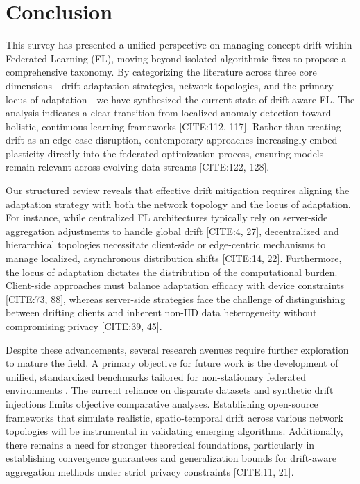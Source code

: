 \documentclass[journal]{IEEEtran}
\begin{document}
\section{Conclusion}
\label{sec:conclusion}

This survey has presented a unified perspective on managing concept drift within Federated Learning (FL), moving beyond isolated algorithmic fixes to propose a comprehensive taxonomy. By categorizing the literature across three core dimensions—drift adaptation strategies, network topologies, and the primary locus of adaptation—we have synthesized the current state of drift-aware FL. The analysis indicates a clear transition from localized anomaly detection toward holistic, continuous learning frameworks [CITE:112, 117]. Rather than treating drift as an edge-case disruption, contemporary approaches increasingly embed plasticity directly into the federated optimization process, ensuring models remain relevant across evolving data streams [CITE:122, 128].

Our structured review reveals that effective drift mitigation requires aligning the adaptation strategy with both the network topology and the locus of adaptation. For instance, while centralized FL architectures typically rely on server-side aggregation adjustments to handle global drift [CITE:4, 27], decentralized and hierarchical topologies necessitate client-side or edge-centric mechanisms to manage localized, asynchronous distribution shifts [CITE:14, 22]. Furthermore, the locus of adaptation dictates the distribution of the computational burden. Client-side approaches must balance adaptation efficacy with device constraints [CITE:73, 88], whereas server-side strategies face the challenge of distinguishing between drifting clients and inherent non-IID data heterogeneity without compromising privacy [CITE:39, 45]. 

Despite these advancements, several research avenues require further exploration to mature the field. A primary objective for future work is the development of unified, standardized benchmarks tailored for non-stationary federated environments \cite{Mahdi2025}. The current reliance on disparate datasets and synthetic drift injections limits objective comparative analyses. Establishing open-source frameworks that simulate realistic, spatio-temporal drift across various network topologies will be instrumental in validating emerging algorithms. Additionally, there remains a need for stronger theoretical foundations, particularly in establishing convergence guarantees and generalization bounds for drift-aware aggregation methods under strict privacy constraints [CITE:11, 21].
\end{document}

